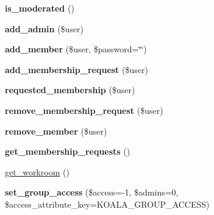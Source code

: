 \begin{DoxyCompactItemize}
\item 
\hypertarget{classkoala__group__default_abfdf74536092880f1f2b3d18ca8728ff}{
{\bfseries is\_\-moderated} ()}
\label{classkoala__group__default_abfdf74536092880f1f2b3d18ca8728ff}

\item 
\hypertarget{classkoala__group__default_a3b648dc484cfb4ead048e9bea35b28de}{
{\bfseries add\_\-admin} (\$user)}
\label{classkoala__group__default_a3b648dc484cfb4ead048e9bea35b28de}

\item 
\hypertarget{classkoala__group__default_aac1f6fb263c617bef790ff0c58ac14fc}{
{\bfseries add\_\-member} (\$user, \$password=\char`\"{}\char`\"{})}
\label{classkoala__group__default_aac1f6fb263c617bef790ff0c58ac14fc}

\item 
\hypertarget{classkoala__group__default_af66adfaeddb1eab91ad160cfe7df99b1}{
{\bfseries add\_\-membership\_\-request} (\$user)}
\label{classkoala__group__default_af66adfaeddb1eab91ad160cfe7df99b1}

\item 
\hypertarget{classkoala__group__default_a8293080aa81f7d84ba1d9b4a6d08facb}{
{\bfseries requested\_\-membership} (\$user)}
\label{classkoala__group__default_a8293080aa81f7d84ba1d9b4a6d08facb}

\item 
\hypertarget{classkoala__group__default_a49f64539d948d78c0fbabec12466bb59}{
{\bfseries remove\_\-membership\_\-request} (\$user)}
\label{classkoala__group__default_a49f64539d948d78c0fbabec12466bb59}

\item 
\hypertarget{classkoala__group__default_aac61094761c3021f9f138a78bd725665}{
{\bfseries remove\_\-member} (\$user)}
\label{classkoala__group__default_aac61094761c3021f9f138a78bd725665}

\item 
\hypertarget{classkoala__group__default_ae20e38fe4935294e024e9faaaf91cf6f}{
{\bfseries get\_\-membership\_\-requests} ()}
\label{classkoala__group__default_ae20e38fe4935294e024e9faaaf91cf6f}

\item 
\hyperlink{classkoala__group__default_a01214ae90570c8459ca7a139aa8bd532}{get\_\-workroom} ()
\item 
\hypertarget{classkoala__group__default_ad4b070c77a3a27745f4a61527474d030}{
{\bfseries set\_\-group\_\-access} (\$access=-\/1, \$admins=0, \$access\_\-attribute\_\-key=KOALA\_\-GROUP\_\-ACCESS)}
\label{classkoala__group__default_ad4b070c77a3a27745f4a61527474d030}

\end{DoxyCompactItemize}
